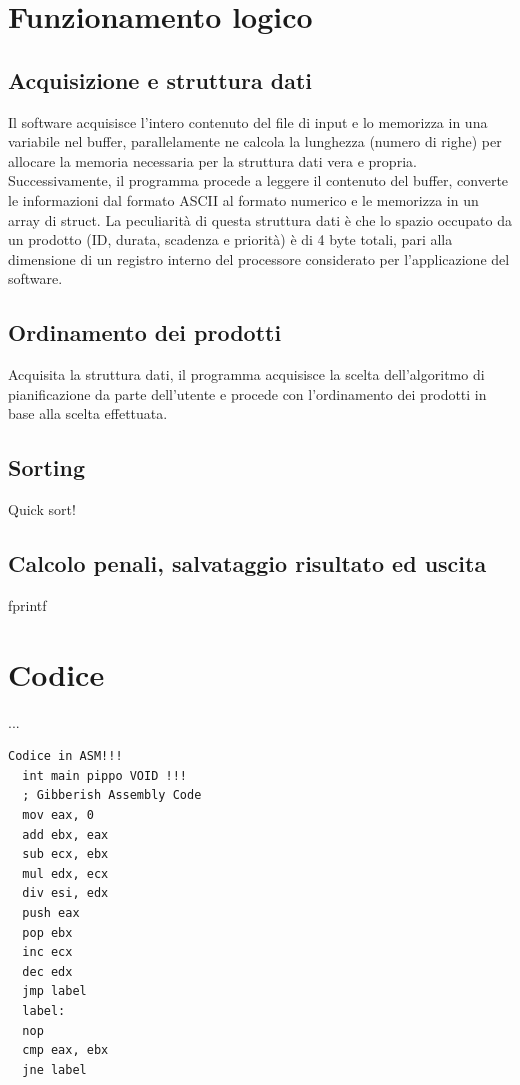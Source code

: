 \documentclass[a4paper]{report}
\begin{document}
\section{Funzionamento logico}

\subsection{Acquisizione e struttura dati}
Il software acquisisce l'intero contenuto del file di input e lo memorizza in una variabile nel buffer, parallelamente ne calcola la lunghezza (numero di righe) per allocare la memoria necessaria per la struttura dati vera e propria. Successivamente, il programma procede a leggere il contenuto del buffer, converte le informazioni dal formato ASCII al formato numerico e le memorizza in un array di struct. La peculiarità di questa struttura dati è che lo spazio occupato da un prodotto (ID, durata, scadenza e priorità) è di 4 byte totali, pari alla dimensione di un registro interno del processore considerato per l'applicazione del software.

\subsection{Ordinamento dei prodotti}
Acquisita la struttura dati, il programma acquisisce la scelta dell'algoritmo di pianificazione da parte dell'utente e procede con l'ordinamento dei prodotti in base alla scelta effettuata.

\subsection{Sorting}
Quick sort!

\subsection{Calcolo penali, salvataggio risultato ed uscita}
fprintf

\section{Codice}

...

\begin{lstlisting}[firstnumber=34]
  Codice in ASM!!!
  int main pippo VOID !!!
  ; Gibberish Assembly Code
  mov eax, 0
  add ebx, eax
  sub ecx, ebx
  mul edx, ecx
  div esi, edx
  push eax
  pop ebx
  inc ecx
  dec edx
  jmp label
  label:
  nop
  cmp eax, ebx
  jne label
\end{lstlisting}
\end{document}
